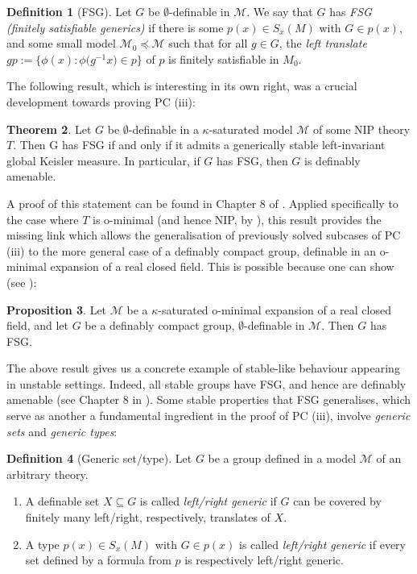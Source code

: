 \documentclass[a4paper]{report}
\newcommand{\ind}{\hspace{15pt}}
\newcommand{\M}{\mathcal{M}}
\theoremstyle{definition}
\newtheorem{thm}{Theorem}[chapter]
\newtheorem{prop}[thm]{Proposition}
\newtheorem{defn}[thm]{Definition}
\theoremstyle{remstyle}
\begin{document}
\begin{defn}[FSG]
	Let $G$ be $\emptyset$-definable in $\M$. We say that $G$ has \emph{FSG (finitely satisfiable generics)} if there is some $p(x)\in S_x(M)$ with $G\in p(x)$, and some small model $\M_0\preceq \M$ such that for all $g\in G$, the \emph{left translate} $gp:=\big\{\phi(x):\phi\big(g^{-1}x\big)\in p\big\}$ of $p$ is finitely satisfiable in $M_0$.
\end{defn}

\ind The following result, which is interesting in its own right, was a crucial development towards proving PC (iii):

\begin{thm}\label{gen stable}
	Let $G$ be $\emptyset$-definable in a $\kappa$-saturated model $\M$ of some NIP theory $T$. Then G has FSG if and only if it admits a generically stable left-invariant global Keisler measure. In particular, if $G$ has FSG, then $G$ is definably amenable.
\end{thm}

\ind A proof of this statement can be found in Chapter 8 of \cite{nip guide}. Applied specifically to the case where $T$ is o-minimal (and hence NIP, by ), this result provides the missing link which allows the generalisation of previously solved subcases of PC (iii) to the more general case of a definably compact group, definable in an o-minimal expansion of a real closed field. This is possible because one can show (see \cite{groups measures nip}):

\begin{prop}\label{FSG}
	Let $\M$ be a $\kappa$-saturated o-minimal expansion of a real closed field, and let $G$ be a definably compact group, $\emptyset$-definable in $\M$. Then $G$ has FSG.
\end{prop}

\ind The above result gives us a concrete example of stable-like behaviour appearing in unstable settings. Indeed, all stable groups have FSG, and hence are definably amenable (see Chapter 8 in \cite{nip guide}). Some stable properties that FSG generalises, which serve as another a fundamental ingredient in the proof of PC (iii), involve \emph{generic sets} and \emph{generic types}:

\begin{defn}[Generic set/type] Let $G$ be a group defined in a model $\M$ of an arbitrary theory.
	\begin{enumerate}
		\item A definable set $X\subseteq G$ is called \emph{left/right generic} if $G$ can be covered by finitely many left/right, respectively, translates of $X$.
		\item A type $p(x)\in S_x(M)$ with $G\in p(x)$ is called \emph{left/right generic} if every set defined by a formula from $p$ is respectively left/right generic.
	\end{enumerate}
\end{defn}
\end{document}
